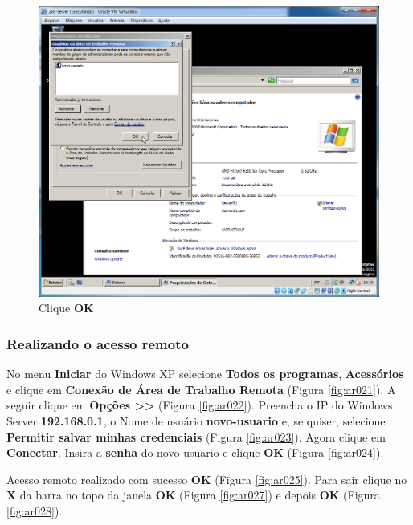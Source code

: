 \documentclass[10pt]{article}
\begin{document}
\begin{figure}[H]
    \centering
    \caption{Clique \textbf{OK}}
    \label{fig:ar019}
    \includegraphics[width=\linewidth]{images/acesso_remoto/ar019.png}
\end{figure}

\subsubsection{Realizando o acesso remoto}
\par No menu \textbf{Iniciar} do Windows XP selecione \textbf{Todos os programas}, \textbf{Acessórios} e clique em \textbf{Conexão de Área de Trabalho Remota} (Figura \ref{fig:ar021}). A seguir clique em \textbf{Opções >>} (Figura \ref{fig:ar022}). Preencha o IP do Windows Server \textbf{192.168.0.1}, o Nome de usuário \textbf{novo-usuario} e, se quiser, selecione \textbf{Permitir salvar minhas credenciais} (Figura \ref{fig:ar023}). Agora clique em \textbf{Conectar}. Insira a \textbf{senha} do novo-usuario e clique \textbf{OK} (Figura \ref{fig:ar024}). 
\par Acesso remoto realizado com sucesso \textbf{OK} (Figura \ref{fig:ar025}). Para sair clique no \textbf{X} da barra no topo da janela \textbf{OK} (Figura \ref{fig:ar027}) e depois \textbf{OK} (Figura \ref{fig:ar028}).
\end{document}
